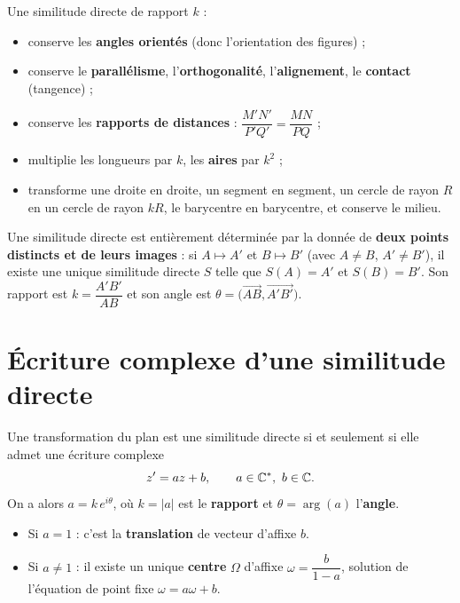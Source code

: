 \begin{propriete}[Conservations]
Une similitude directe de rapport $k$ :
\begin{itemize}
\item conserve les \textbf{angles orientés} (donc l'orientation des figures) ;
\item conserve le \textbf{parallélisme}, l'\textbf{orthogonalité}, l'\textbf{alignement}, le \textbf{contact} (tangence) ;
\item conserve les \textbf{rapports de distances} : $\dfrac{M'N'}{P'Q'}=\dfrac{MN}{PQ}$ ;
\item multiplie les longueurs par $k$, les \textbf{aires} par $k^{2}$ ;
\item transforme une droite en droite, un segment en segment, un cercle de rayon $R$ en un cercle de rayon $kR$,
le barycentre en barycentre, et conserve le milieu.
\end{itemize}
\end{propriete}

\begin{aretenir}
Une similitude directe est entièrement déterminée par la donnée de \textbf{deux points distincts et de
leurs images} : si $A\mapsto A'$ et $B\mapsto B'$ (avec $A\neq B$, $A'\neq B'$), il existe une unique
similitude directe $S$ telle que $S(A)=A'$ et $S(B)=B'$. Son rapport est $k=\dfrac{A'B'}{AB}$ et son
angle est $\theta=\big(\overrightarrow{AB},\overrightarrow{A'B'}\big)$.
\end{aretenir}

\section{Écriture complexe d'une similitude directe}

\begin{theoreme}
Une transformation du plan est une similitude directe si et seulement si elle admet une écriture complexe
\[
z'=az+b,\qquad a\in\mathbb{C}^{*},\ b\in\mathbb{C}.
\]
On a alors $a=k\,e^{i\theta}$, où $k=|a|$ est le \textbf{rapport} et $\theta=\arg(a)$ l'\textbf{angle}.
\begin{itemize}
\item Si $a=1$ : c'est la \textbf{translation} de vecteur d'affixe $b$.
\item Si $a\neq1$ : il existe un unique \textbf{centre} $\Omega$ d'affixe $\omega=\dfrac{b}{1-a}$,
solution de l'équation de point fixe $\omega=a\omega+b$.
\end{itemize}
\end{theoreme}

